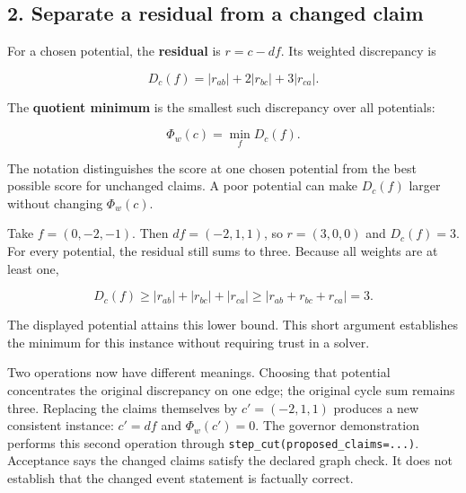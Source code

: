 \documentclass[
  11pt,
]{article}
\begin{document}
\hypertarget{separate-a-residual-from-a-changed-claim}{%
\subsection{2. Separate a residual from a changed
claim}\label{separate-a-residual-from-a-changed-claim}}

For a chosen potential, the \textbf{residual} is \(r=c-df\). Its
weighted discrepancy is

\[
D_c(f)=|r_{ab}|+2|r_{bc}|+3|r_{ca}|.
\]

The \textbf{quotient minimum} is the smallest such discrepancy over all
potentials:

\[
\Phi_w(c)=\min_f D_c(f).
\]

The notation distinguishes the score at one chosen potential from the
best possible score for unchanged claims. A poor potential can make
\(D_c(f)\) larger without changing \(\Phi_w(c)\).

Take \(f=(0,-2,-1)\). Then \(df=(-2,1,1)\), so \(r=(3,0,0)\) and
\(D_c(f)=3\). For every potential, the residual still sums to three.
Because all weights are at least one,

\[
D_c(f)\geq |r_{ab}|+|r_{bc}|+|r_{ca}|
\geq |r_{ab}+r_{bc}+r_{ca}|=3.
\]

The displayed potential attains this lower bound. This short argument
establishes the minimum for this instance without requiring trust in a
solver.

Two operations now have different meanings. Choosing that potential
concentrates the original discrepancy on one edge; the original cycle
sum remains three. Replacing the claims themselves by \(c'=(-2,1,1)\)
produces a new consistent instance: \(c'=df\) and \(\Phi_w(c')=0\). The
governor demonstration performs this second operation through
\texttt{step\_cut(proposed\_claims=...)}. Acceptance says the changed
claims satisfy the declared graph check. It does not establish that the
changed event statement is factually correct.
\end{document}
